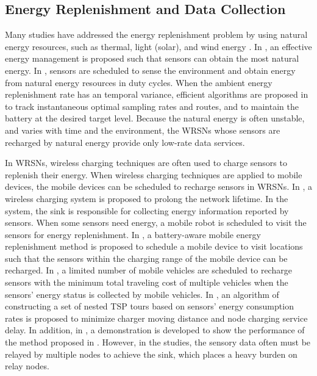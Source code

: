 \subsection{Energy Replenishment and Data Collection}
Many studies have addressed the energy replenishment problem by
using natural energy resources, such as thermal, light (solar), and
wind energy \cite{ACM20,IEEE21,IEEE22}. In \cite{ACM20}, an
effective energy management is proposed such that sensors can obtain
the most natural energy. In \cite{IEEE21}, sensors are scheduled to
sense the environment and obtain energy from natural energy
resources in duty cycles. When the ambient energy
replenishment rate has an temporal variance, efficient algorithms
are proposed in \cite{IEEE22} to track instantaneous optimal
sampling rates and routes, and to maintain the battery at the
desired target level. Because the natural energy is often unstable,
and varies with time and the environment, the WRSNs whose sensors
are recharged by natural energy provide only low-rate data services.


In WRSNs, wireless charging techniques are often used to charge
sensors to replenish their energy. When wireless charging techniques
are applied to mobile devices, the mobile devices can be scheduled
to recharge sensors in WRSNs. In \cite{IEEE8}, a wireless charging
system is proposed to prolong the network lifetime. In the system,
the sink is responsible for collecting energy information reported
by sensors. When some sensors need energy, a mobile robot is
scheduled to visit the sensors for energy replenishment. In
\cite{IEEE19}, a battery-aware mobile energy replenishment method is
proposed to schedule a mobile device to visit locations such that
the sensors within the charging range of the mobile device can be
recharged. In \cite{IEEE11}, a limited number of mobile vehicles are
scheduled to recharge sensors with the minimum total traveling cost
of multiple vehicles when the sensors' energy status is collected by
mobile vehicles. In \cite{revised1}, an algorithm of constructing
a set of nested TSP tours based on sensors' energy consumption rates
is proposed to minimize charger moving distance and node charging
service delay. In addition, in \cite{revised2}, a demonstration is developed to
show the performance of the method proposed in \cite{revised1}. However, in
the studies, the sensory data often must be relayed by multiple
nodes to achieve the sink, which places a heavy burden on relay
nodes.


